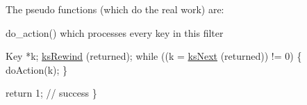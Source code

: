 The pseudo functions (which do the real work) are\+:
\begin{DoxyItemize}
\item do\+\_\+action() which processes every key in this filter
\end{DoxyItemize}


\begin{DoxyCodeInclude}
        Key *k;
        \hyperlink{group__keyset_gabe793ff51f1728e3429c84a8a9086b70}{ksRewind} (returned);
        \textcolor{keywordflow}{while} ((k = \hyperlink{group__keyset_ga317321c9065b5a4b3e33fe1c399bcec9}{ksNext} (returned)) != 0)
        \{
                doAction(k);
        \}

        \textcolor{keywordflow}{return} 1; \textcolor{comment}{// success}
\}
\end{DoxyCodeInclude}


